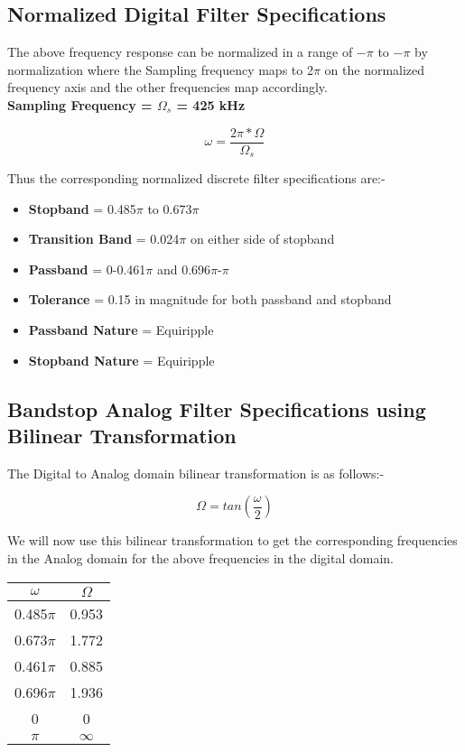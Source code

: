 \documentclass[12pt]{article}
\begin{document}
\subsection{Normalized Digital Filter Specifications}
The above frequency response can be normalized in a range of $-\pi$ to $-\pi$ by normalization where the Sampling frequency maps to 2$\pi$ on the normalized frequency axis and the other frequencies map accordingly.\\
\textbf{Sampling Frequency = $\Omega_{s}$ = 425 kHz}

\[\omega = \frac{2\pi*\Omega}{\Omega_{s}}\]

Thus the corresponding normalized discrete filter specifications are:-
\begin{itemize}
    \item \textbf{Stopband} = 0.485$\pi$ to 0.673$\pi$
    \item \textbf{Transition Band} = 0.024$\pi$ on either side of stopband
    \item \textbf{Passband} = 0-0.461$\pi$ and 0.696$\pi$-$\pi$
    \item\textbf{Tolerance} = 0.15 in magnitude for both passband and stopband
    \item \textbf{Passband Nature} = Equiripple
    \item \textbf{Stopband Nature} = Equiripple
\end{itemize}

\subsection{Bandstop Analog Filter Specifications using Bilinear Transformation}
The Digital to Analog domain bilinear transformation is as follows:-

\[\Omega = tan(\frac{\omega}{2})\]

\noindent
We will now use this bilinear transformation to get the corresponding frequencies in the Analog domain for the above frequencies in the digital domain.

\begin{center}
    \begin{tabular}{|c|c|}
     \hline
    $\omega$ & $\Omega$ \\ \hline
    0.485$\pi$ & 0.953 \\ \hline
    0.673$\pi$ & 1.772 \\ \hline
    0.461$\pi$ & 0.885 \\ \hline
    0.696$\pi$ & 1.936 \\ \hline
    0 & 0 \\ \hline
    $\pi$ & $\infty$ \\ \hline
    \end{tabular}
\end{center}
\end{document}
